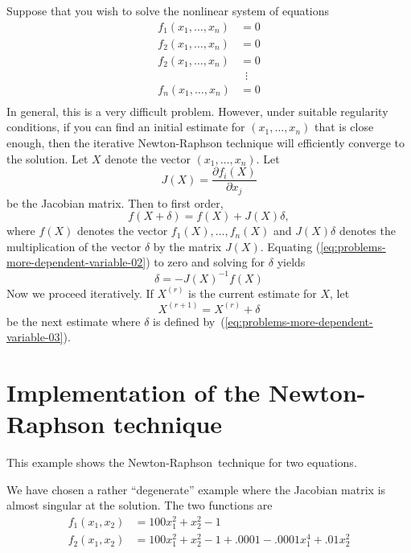 \documentclass{admbmanual}
\newcommand\nr{{Newton-Raphson}}
\begin{document}
Suppose that you wish to solve the nonlinear system of
equations 
\begin{align}\label{eq:problems-more-dependent-variable-01}  \nonumber %
f_1(x_1,\ldots,x_n)&=0\\ \nonumber
f_2(x_1,\ldots,x_n)&=0\\
f_2(x_1,\ldots,x_n)&=0\\  \nonumber
& \,\,\,\vdots\\ \nonumber
f_n(x_1,\ldots,x_n)&=0\\ \nonumber
 \end{align}
In general, this is a very difficult problem. However, under
suitable regularity conditions, if you can
find an initial estimate for $(x_1,\ldots,x_n)$ that
is close enough, then the iterative Newton-Raphson technique
will efficiently converge to the solution. Let $X$ denote the
vector $(x_1,\ldots,x_n)$. Let
\begin{equation*}
  J(X)=\frac{\partial f_i(X)}{\partial x_j}
\end{equation*}
be the Jacobian matrix. Then to first order,
\begin{equation}\label{eq:problems-more-dependent-variable-02} %
  f(X+\delta)=f(X)+J(X)\delta,
\end{equation}
where $f(X)$
denotes the vector $f_1(X),\ldots,f_n(X)$ and
$J(X)\delta$ denotes the multiplication of the vector $\delta$
by the matrix $J(X)$. Equating (\ref{eq:problems-more-dependent-variable-02}) %
to zero and solving for $\delta$ yields
\begin{equation}\label{eq:problems-more-dependent-variable-03} %
  \delta=-J(X)^{-1}f(X)
\end{equation}
Now we proceed iteratively. If $X^{(r)}$ is the current estimate for
$X$, let 
\begin{equation*}
  X^{(r+1)}=X^{(r)} +\delta
\end{equation*}
 be the next estimate where $\delta$
is defined by~(\ref{eq:problems-more-dependent-variable-03}). %


\section{Implementation of the Newton-Raphson technique}

This example shows the \nr\ technique for two equations. 


We have chosen a rather ``degenerate'' example where the Jacobian
matrix is almost singular at the solution. The two functions are
\begin{align*}
  f_1(x_1,x_2)&=100x_1^2+x_2^2-1 \\[6pt]
  f_2(x_1,x_2)&=100x_1^2+x_2^2-1+.0001-.0001x_1^4+.01x_2^2 
\end{align*}
\end{document}
